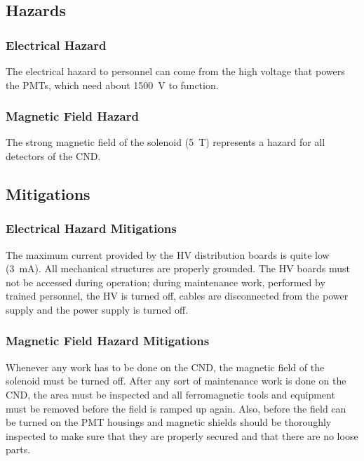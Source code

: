 \subsection{Hazards} 

\subsubsection{Electrical Hazard}

The electrical hazard to personnel can come from the high voltage that powers the PMTs, which 
need about 1500~V to function. 

\subsubsection{Magnetic Field Hazard}

The strong magnetic field of the solenoid (5~T) represents a hazard for all detectors of the
CND.

\subsection{Mitigations}

\subsubsection{Electrical Hazard Mitigations} 

The maximum current provided by the HV distribution boards is quite low (3~mA). All mechanical 
structures are properly grounded. The HV boards must not be accessed during operation; during 
maintenance work, performed by trained personnel, the HV is turned off, cables are disconnected 
from the power supply and the power supply is turned off. 

\subsubsection{Magnetic Field Hazard Mitigations}

Whenever any work has to be done on the CND, the magnetic field of the solenoid must be turned 
off. After any sort of maintenance work is done on the CND, the area must be inspected and all 
ferromagnetic tools and equipment must be removed before the field is ramped up again. Also, 
before the field can be turned on the PMT housings and magnetic shields should be thoroughly 
inspected to make sure that they are properly secured and that there are no loose parts. 

